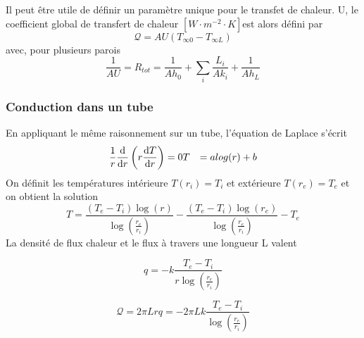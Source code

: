 \documentclass[a4paper,11pt]{report}
\newcommand{\recip}[1]{\frac{1}{#1}}
\begin{document}
      Il peut être utile de définir un paramètre unique pour le transfet de chaleur. U, le coefficient global de transfert de chaleur $[\si{W \cdot m^{-2} \cdot K}]$est alors défini par
      \begin{equation}
        \mathcal{Q} = AU(T_{\infty 0} - T_{\infty L})
      \end{equation}
      avec, pour plusieurs parois
      \begin{equation}
        \recip{AU} = R_{tot} = \recip{Ah_0} + \sum_i \frac{L_i}{Ak_i} + \recip{Ah_L}
      \end{equation}

      \subsubsection{Conduction dans un tube}
        En appliquant le même raisonnement sur un tube, l'équation de Laplace s'écrit
        \begin{equation}
          \begin{aligned}
            \recip{r}\dv{r}\left(r\dv{T}{r}\right) &= 0
            T &= a log(r) + b
          \end{aligned}
        \end{equation}
        On définit les températures intérieure $T(r_i)= T_i$ et extérieure $T(r_e) = T_e$ et on obtient la solution
        \begin{equation}
          T = \frac{(T_e - T_i) \log(r)}{\log\left(\frac{r_e}{r_i}\right)} - \frac{(T_e - T_i) \log(r_e)}{\log\left(\frac{r_e}{r_i}\right)} - T_e
        \end{equation}
        La densité de flux chaleur et le flux à travers une longueur L valent
        \begin{multicols}{2}
          \begin{equation}
            q = -k \frac{T_e - T_i}{r\log\left(\frac{r_e}{r_i}\right)} \nonumber
          \end{equation}

          \begin{equation}
            \mathcal{Q} = 2\pi Lrq = -2\pi L k \frac{T_e - T_i}{\log\left(\frac{r_e}{r_i}\right)}
          \end{equation}
        \end{multicols}

\end{document}
